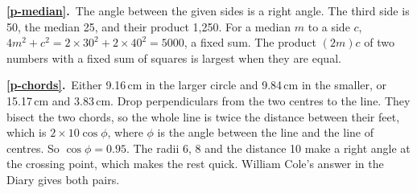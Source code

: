 \documentclass[11pt,a4paper]{article}
\newcommand{\ans}[2]{\par\smallskip\noindent\textbf{\ref{#1}.}\ #2}
\begin{document}
\ans{p-median}{The angle between the given sides is a right angle. The third side is 50,
the median 25, and their product 1,250. For a median $m$ to a side $c$,
$4m^2 + c^2 = 2\times30^2 + 2\times40^2 = 5000$, a fixed sum. The product $(2m)c$ of two
numbers with a fixed sum of squares is largest when they are equal.}
\ans{p-chords}{Either 9.16\,cm in the larger circle and 9.84\,cm in the smaller, or
15.17\,cm and 3.83\,cm. Drop perpendiculars from the two centres to the line. They bisect
the two chords, so the whole line is twice the distance between their feet, which is
$2\times10\cos\phi$, where $\phi$ is the angle between the line and the line of centres.
So $\cos\phi = 0.95$. The radii 6, 8 and the distance 10 make a right angle at the
crossing point, which makes the rest quick. William Cole's answer in the Diary gives
both pairs.}
\end{document}
